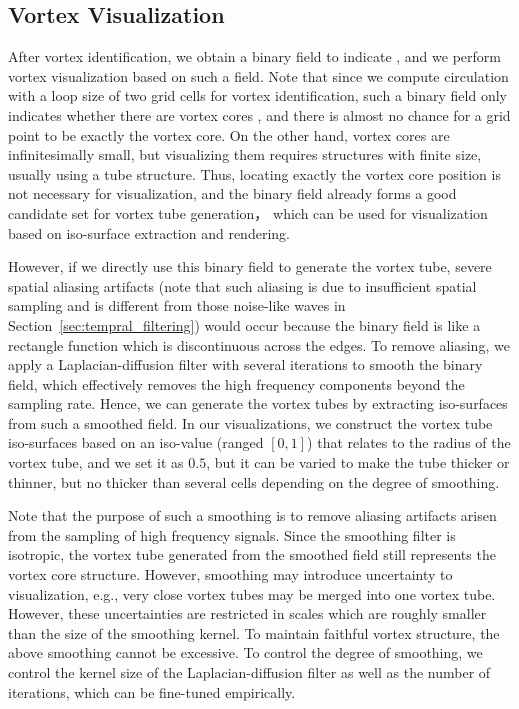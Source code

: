 \documentclass[10pt,journal,compsoc,twoside]{IEEEtran}
\newcommand{\rd}[1]{{\color[rgb]{0.0,0.0,0.0}{#1}}}
\begin{document}

	\subsection{Vortex Visualization}
	After vortex identification, we obtain a binary field to indicate \rd{whether each grid point is a vortex point or not}, and we perform vortex visualization based on such a field.
	Note that since we compute circulation with a loop size of two grid cells for vortex identification, such a binary field only indicates whether there are vortex cores \rd{inside the loop}, and there is almost no chance for a grid point to be exactly the vortex core.
	On the other hand, vortex cores are infinitesimally small, but visualizing them requires structures with finite size, usually using a tube structure.
	Thus, locating exactly the vortex core position is not necessary for visualization, and the binary field already forms a good candidate set for vortex tube generation， which can be used for visualization based on iso-surface extraction and rendering.
	
	However, if we directly use this binary field to generate the vortex tube, severe spatial aliasing artifacts (note that such aliasing is due to insufficient spatial sampling and is different from those noise-like waves in Section~\ref{sec:tempral_filtering}) would occur because the binary field is like a rectangle function which is discontinuous across the edges.
	To remove aliasing, we apply a Laplacian-diffusion filter with several iterations to smooth the binary field, which effectively removes the high frequency components beyond the sampling rate.
	Hence, we can generate the vortex tubes by extracting iso-surfaces from such a smoothed field.
	In our visualizations, we construct the vortex tube iso-surfaces based on an iso-value (ranged $[0,1]$) that relates to the radius of the vortex tube, and we set it as $0.5$, but it can be varied to make the tube thicker or thinner, but no thicker than several cells depending on the degree of smoothing.
	
	Note that the purpose of such a smoothing is to remove aliasing artifacts arisen from the sampling of high frequency signals.
	Since the smoothing filter is isotropic, the vortex tube generated from the smoothed field still represents the vortex core structure.
	However, smoothing may introduce uncertainty to visualization, e.g., very close vortex tubes may be merged into one vortex tube. However, these uncertainties are restricted in scales which are roughly smaller than the size of the smoothing kernel.
	To maintain faithful vortex structure, the above smoothing cannot be excessive.
	To control the degree of smoothing, we control the kernel size of the Laplacian-diffusion filter as well as the number of iterations, which can be fine-tuned empirically.
	
\end{document}
